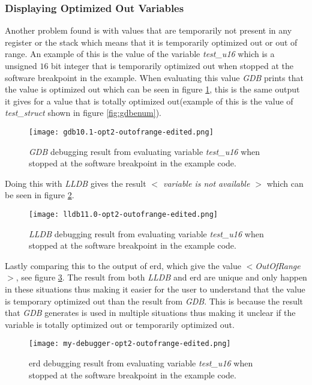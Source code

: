 \subsubsection{Displaying Optimized Out Variables}
Another problem found is with values that are temporarily not present in any register or the stack which means that it is temporarily optimized out or out of range.
An example of this is the value of the variable \emph{test\_u16} which is a unsigned $16$ bit integer that is temporarily optimized out when stopped at the software breakpoint in the example.
When evaluating this value \emph{GDB} prints that the value is optimized out which can be seen in figure \ref{fig:gdboutofrange}, this is the same output it gives for a value that is totally optimized out(example of this is the value of \emph{test\_struct} shown in figure \ref{fig:gdbenum}).


\begin{figure}[h]
	\centering
	\texttt{[image: gdb10.1-opt2-outofrange-edited.png]}
	\caption{\emph{GDB} debugging result from evaluating variable \emph{test\_u16} when stopped at the software breakpoint in the example code.}
	\label{fig:gdboutofrange}
\end{figure}


Doing this with \emph{LLDB} gives the result  \emph{$<$ variable is not available $>$} which can be seen in figure \ref{fig:lldboutofrange}.


\begin{figure}[h]
	\centering
	\texttt{[image: lldb11.0-opt2-outofrange-edited.png]}
	\caption{\emph{LLDB} debugging result from evaluating variable \emph{test\_u16} when stopped at the software breakpoint in the example code.}
	\label{fig:lldboutofrange}
\end{figure}


Lastly comparing this to the output of \gls{erd}, which give the value \emph{$<$OutOfRange$>$}, see figure \ref{fig:mydebuggeroutofrange}.
The result from both \emph{LLDB} and \gls{erd} are unique and only happen in these situations thus making it easier for the user to understand that the value is temporary optimized out than the result from \emph{GDB}.
This is because the result that \emph{GDB} generates is used in multiple situations thus making it unclear if the variable is totally optimized out or temporarily optimized out.


\begin{figure}[h]
	\centering
	\texttt{[image: my-debugger-opt2-outofrange-edited.png]}
	\caption{\gls{erd} debugging result from evaluating variable \emph{test\_u16} when stopped at the software breakpoint in the example code.}
	\label{fig:mydebuggeroutofrange}
\end{figure}

